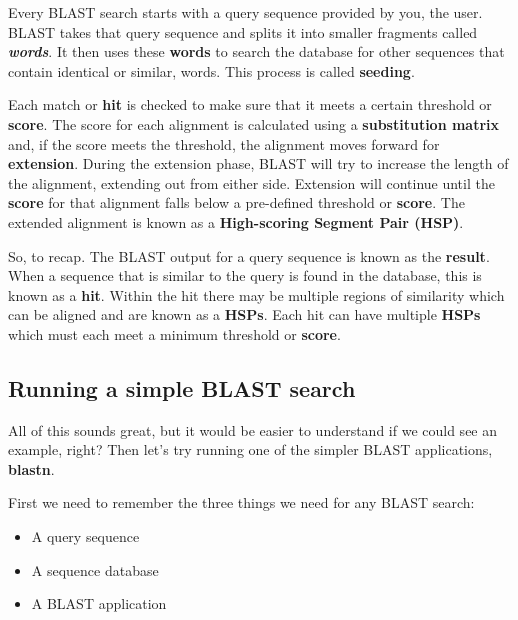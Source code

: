 \documentclass[11pt]{article}
\providecommand{\tightlist}{%
      \setlength{\itemsep}{0pt}\setlength{\parskip}{0pt}}
\begin{document}
    Every BLAST search starts with a query sequence provided by you, the
user. BLAST takes that query sequence and splits it into smaller
fragments called \textbf{\textit{words}}. It then uses these
\textbf{words} to search the database for other sequences that contain
identical or similar, words. This process is called \textbf{seeding}.

Each match or \textbf{hit} is checked to make sure that it meets a
certain threshold or \textbf{score}. The score for each alignment is
calculated using a \textbf{substitution matrix} and, if the score meets
the threshold, the alignment moves forward for \textbf{extension}.
During the extension phase, BLAST will try to increase the length of the
alignment, extending out from either side. Extension will continue until
the \textbf{score} for that alignment falls below a pre-defined
threshold or \textbf{score}. The extended alignment is known as a
\textbf{High-scoring Segment Pair (HSP)}.

So, to recap. The BLAST output for a query sequence is known as the
\textbf{result}. When a sequence that is similar to the query is found
in the database, this is known as a \textbf{hit}. Within the hit there
may be multiple regions of similarity which can be aligned and are known
as a \textbf{HSPs}. Each hit can have multiple \textbf{HSPs} which must
each meet a minimum threshold or \textbf{score}.

    \hypertarget{running-a-simple-blast-search}{%
\subsection{Running a simple BLAST
search}\label{running-a-simple-blast-search}}

All of this sounds great, but it would be easier to understand if we
could see an example, right? Then let's try running one of the simpler
BLAST applications, \textbf{blastn}.



\newpage




First we need to remember the three things we need for any BLAST search:

\begin{itemize}
\tightlist
\item
  A query sequence
\item
  A sequence database
\item
  A BLAST application
\end{itemize}
\end{document}

